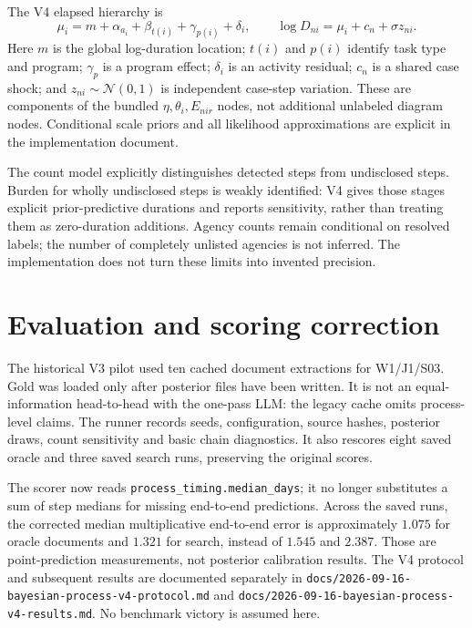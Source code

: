 \documentclass[11pt]{article}
\begin{document}
The V4 elapsed hierarchy is
\[
 \mu_i=m+\alpha_{a_i}+\beta_{t(i)}+\gamma_{p(i)}+\delta_i,
 \qquad \log D_{ni}=\mu_i+c_n+\sigma z_{ni}.
\]
Here $m$ is the global log-duration location; $t(i)$ and $p(i)$ identify task type
and program; $\gamma_p$ is a program effect; $\delta_i$ is an activity residual;
$c_n$ is a shared case shock; and $z_{ni}\sim\mathcal N(0,1)$ is independent
case-step variation. These are components of the bundled $\eta,\theta_i,E_{nir}$
nodes, not additional unlabeled diagram nodes. Conditional scale priors and all
likelihood approximations are explicit in the implementation document.

The count model explicitly distinguishes detected steps from undisclosed steps.
Burden for wholly undisclosed steps is weakly identified: V4 gives those stages
explicit prior-predictive durations and reports sensitivity, rather than treating
them as zero-duration additions. Agency counts remain conditional on resolved
labels; the number of completely unlisted agencies is not inferred.
The implementation does not turn these limits into invented precision.

\section{Evaluation and scoring correction}
The historical V3 pilot used ten cached document extractions for W1/J1/S03. Gold was loaded
only after posterior files have been written. It is not an equal-information
head-to-head with the one-pass LLM: the legacy cache omits process-level claims.
The runner records seeds, configuration, source hashes, posterior draws, count
sensitivity and basic chain diagnostics. It also rescores eight saved oracle
and three saved search runs, preserving the original scores.

The scorer now reads \texttt{process\_timing.median\_days}; it no longer substitutes
a sum of step medians for missing end-to-end predictions. Across the saved runs,
the corrected median multiplicative end-to-end error is approximately $1.075$
for oracle documents and $1.321$ for search, instead of $1.545$ and $2.387$.
Those are point-prediction measurements, not posterior calibration results.
The V4 protocol and subsequent results are documented separately in
\texttt{docs/2026-09-16-bayesian-process-v4-protocol.md} and
\texttt{docs/2026-09-16-bayesian-process-v4-results.md}. No benchmark victory is assumed here.
\end{document}
